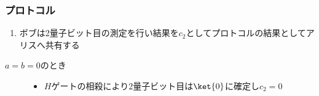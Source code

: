 \begin{frame}
  \frametitle{プロトコル}

  \begin{enumerate}
    \item ボブは2量子ビット目の測定を行い結果を$c_2$としてプロトコルの結果としてアリスへ共有する
  \end{enumerate}


  \begin{description}
    \item[$a = b = 0$のとき]\mbox{}
    \begin{figure}
    \end{figure}
  
    \begin{itemize}
      \item $H$ゲートの相殺により2量子ビット目は$\ket{0}$に確定し$c_2 = 0$
    \end{itemize}
  \end{description}
\end{frame}

